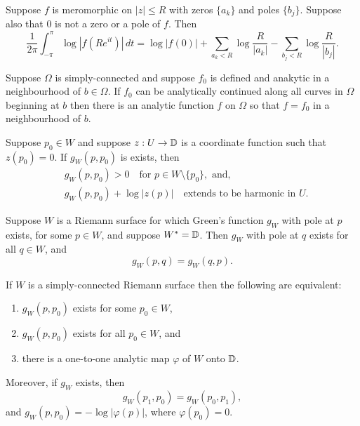 \documentclass[12pt]{article}
\begin{document}
\begin{sats}
    Suppose $f$ is meromorphic on $|z|\leq R$ with zeros $\{a_k\}$ and poles $\{b_j\}$. Suppose also that $0$ is not a zero or a pole of $f$. Then
    \begin{equation*}
        \frac{1}{2\pi}\int_{-\pi}^\pi \log|f(Re^{it})|\,dt=\log|f(0)|+\sum_{a_k<R}\log\frac{R}{|a_k|}-\sum_{b_j<R}\log\frac{R}{|b_j|}.
    \end{equation*}
\end{sats}

\begin{sats}[Monodromy]
    Suppose $\Omega$ is simply-connected and suppose $f_0$ is defined and anakytic in a neighbourhood of $b\in\Omega$. If $f_0$ can be analytically continued along all curves in $\Omega$ beginning at $b$ then there is an analytic function $f$ on $\Omega$ so that $f=f_0$ in a neighbourhood of $b$.
\end{sats}

\begin{sats}
    Suppose $p_0\in W$ and suppose $z:U\to\mathbb{D}$ is a coordinate function such that $z(p_0)=0$. If $g_W(p,p_0)$ is exists, then 
    \begin{align*}
        &g_W(p,p_0)>0\quad \text{for } p\in W\setminus\{p_0\},\text{ and,}\\
        &g_W(p,p_0)+\log |z(p)|\quad\text{extends to be harmonic in } U.
    \end{align*}
\end{sats}

\begin{sats}[Green is symmetric if $W=\D$]
    Suppose $W$ is a Riemann surface for which Green's function $g_W$ with pole at $p$ exists, for some $p\in W$, and suppose $W^*=\mathbb{D}$. Then $g_W$ with pole at $q$ exists for all $q\in W$, and
    \begin{equation*}
        g_W(p,q)=g_W(q,p).
    \end{equation*}
\end{sats}

\begin{sats}
    If $W$ is a simply-connected Riemann surface then the following are equivalent:
    \begin{enumerate}[label=(\roman*)]
        \item $g_W(p,p_0)$ exists for some $p_0\in W$,
        \item $g_W(p,p_0)$ exists for all $p_0\in W$, and
        \item there is a one-to-one analytic map $\varphi$ of $W$ onto $\mathbb{D}$.
    \end{enumerate}
    Moreover, if $g_W$ exists, then
    \begin{equation*}
        g_W(p_1,p_0)=g_W(p_0,p_1),
    \end{equation*}
    and $g_W(p,p_0)=-\log|\varphi(p)|$, where $\varphi(p_0)=0$.
\end{sats}
\end{document}
